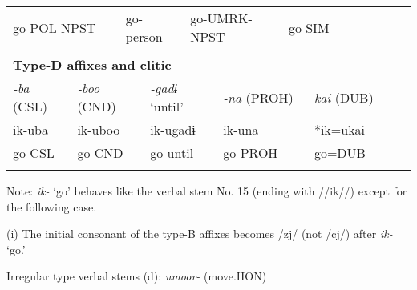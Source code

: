\begin{tabularx}{\textwidth}{XXXXXXXXXXXXXXXXXXXX}
\multicolumn{3}{X}{go-POL-NPST} & \multicolumn{4}{X}{go-person} & \multicolumn{3}{X}{go-UMRK-NPST} & \multicolumn{10}{X}{go-SIM}\\
\multicolumn{20}{X}{}\\
\multicolumn{20}{X}{{\bfseries Type-D affixes and clitic}}\\
{ \textit{{}-ba} (CSL)} & \multicolumn{3}{X}{{ \textit{{}-boo} (CND)}} & \multicolumn{4}{X}{{ \textit{{}-gadɨ} ‘until’}} & \multicolumn{4}{X}{{ \textit{{}-na} (PROH)}} & \multicolumn{8}{X}{{ \textit{kai} (DUB)}}\\
{ ik-uba} & \multicolumn{3}{X}{{ ik-uboo}} & \multicolumn{4}{X}{{ ik-ugadɨ}} & \multicolumn{4}{X}{{ ik-una}} & \multicolumn{8}{X}{{ *ik=ukai}}\\
go-CSL & \multicolumn{3}{X}{go-CND} & \multicolumn{4}{X}{go-until} & \multicolumn{4}{X}{go-PROH} & \multicolumn{8}{X}{go=DUB}\\
\lspbottomrule
\end{tabularx}
Note: \textit{ik-} ‘go’ behaves like the verbal stem No. 15 (ending with //ik//) except for the following case.

(i)  The initial consonant of the type-B affixes becomes /zj/ (not /cj/) after \textit{ik-} ‘go.’

Irregular type verbal stems (d): \textit{umoor-} (move.HON)

\tablefirsthead{}

